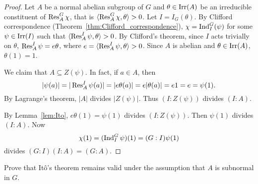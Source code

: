 \begin{proof}
    Let $A$ be a normal abelian subgroup of $G$ and 
    $\theta\in\operatorname{Irr}(A)$ be an irreducible constituent of $\operatorname{Res}_A^G\chi$, that 
    is $\langle\operatorname{Res}_A^G\chi,\theta\rangle>0$. Let $I=I_G(\theta)$. 
    By Clifford correspondence (Theorem~\ref{thm:Clifford_correspondence}), 
    $\chi=\operatorname{Ind}_I^G(\psi)$ for some $\psi\in\operatorname{Irr}(I)$ such that 
    $\langle\operatorname{Res}_A^I\psi,\theta\rangle>0$. By Clifford's theorem, since 
    $I$ acts trivially on $\theta$, 
    $\operatorname{Res}_A^I\psi=e\theta$, where $e=\langle\operatorname{Res}_A^I\psi,\theta\rangle>0$. Since $A$ is abelian and
    $\theta\in\operatorname{Irr}(A)$, $\theta(1)=1$. 
    
    We claim that $A\subseteq Z(\psi)$. In fact, if $a\in A$, then 
    \[
    |\psi(a)|=|\operatorname{Res}_A^I\psi(a)|=|e\theta(a)|=e|\theta(a)|=e1=e=\psi(1).
    \]
    By Lagrange's theorem, $|A|$ divides $|Z(\psi)|$. Thus $(I:Z(\psi))$ divides $(I:A)$. 

    By Lemma~\ref{lem:Ito}, 
    $e\theta(1)=\psi(1)$ divides $(I:Z(\psi))$. Then 
    $\psi(1)$ divides $(I:A)$. Now 
    \[
    \chi(1)=(\operatorname{Ind}_I^G\psi)(1)=(G:I)\psi(1)
    \]
    divides $(G:I)(I:A)=(G:A)$.
\end{proof}

\begin{bonus}
    \label{xca:Reynolds}
	Prove that Itô’s theorem remains valid under the assumption that $A$ is subnormal in $G$.
\end{bonus}


